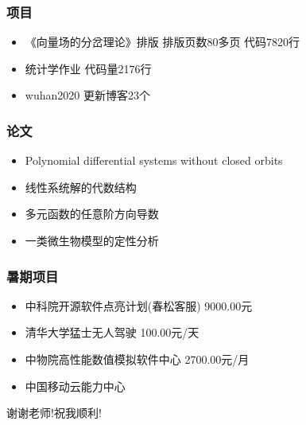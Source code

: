 \documentclass{beamer}
\begin{document}
\begin{frame}
  \frametitle{项目}
 \begin{itemize}
\item 《向量场的分岔理论》排版 排版页数80多页 代码7820行
\pause
\item 统计学作业 代码量2176行 
\pause
\item wuhan2020 更新博客23个
  
\end{itemize}

\end{frame}

\begin{frame}
  \frametitle{论文}
  
  \begin{itemize}
  \item Polynomial differential systems without closed orbits
    \pause
  \item 线性系统解的代数结构
    \pause
  \item 多元函数的任意阶方向导数
    \pause
  \item 一类微生物模型的定性分析
    \pause
  \end{itemize}
  
\end{frame}

\begin{frame}
  \frametitle{暑期项目}
  \begin{itemize}
  \item 中科院开源软件点亮计划(春松客服) 9000.00元
    \pause
  \item 清华大学猛士无人驾驶 100.00元/天
    \pause
  \item 中物院高性能数值模拟软件中心 2700.00元/月
    \pause
    
  \item 中国移动云能力中心 
  \end{itemize}
\end{frame}

\begin{frame}
  \begin{center}
\Huge { 谢谢老师!祝我顺利!}
  \end{center}
\end{frame}


\end{document}
